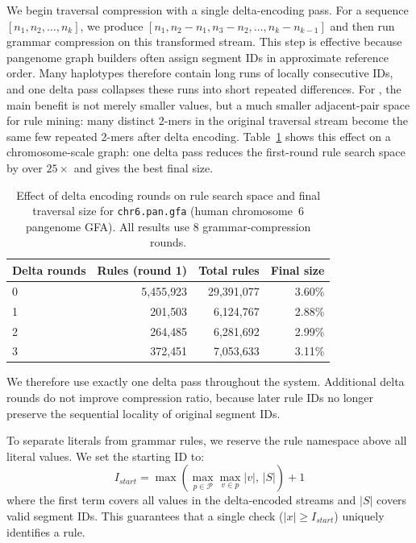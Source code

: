 We begin traversal compression with a single delta-encoding pass. For a sequence $[n_1, n_2, \ldots, n_k]$, we produce $[n_1, n_2 - n_1, n_3 - n_2, \ldots, n_k - n_{k-1}]$ and then run grammar compression on this transformed stream.
This step is effective because pangenome graph builders often assign segment IDs in approximate reference order. Many haplotypes therefore contain long runs of locally consecutive IDs, and one delta pass collapses these runs into short repeated differences. For \gfaz, the main benefit is not merely smaller values, but a much smaller adjacent-pair space for rule mining: many distinct 2-mers in the original traversal stream become the same few repeated 2-mers after delta encoding. Table~\ref{tab:delta-rounds} shows this effect on a chromosome-scale graph: one delta pass reduces the first-round rule search space by over $25\times$ and gives the best final size.

\begin{table}[t]
  \caption{Effect of delta encoding rounds on rule search space and final traversal size for \texttt{chr6.pan.gfa} (human chromosome~6 pangenome GFA). All results use 8 grammar-compression rounds.}
  \label{tab:delta-rounds}
  \small
  \begin{tabular}{lrrr}
    \hline
    \textbf{Delta rounds} & \textbf{Rules (round 1)} & \textbf{Total rules} & \textbf{Final size} \\
    \hline
    0                     & 5{,}455{,}923            & 29{,}391{,}077       & 3.60\%              \\
    1                     & 201{,}503                & 6{,}124{,}767        & 2.88\%              \\
    2                     & 264{,}485                & 6{,}281{,}692        & 2.99\%              \\
    3                     & 372{,}451                & 7{,}053{,}633        & 3.11\%              \\
    \hline
  \end{tabular}
\end{table}

We therefore use exactly one delta pass throughout the system. Additional delta rounds do not improve compression ratio, because later rule IDs no longer preserve the sequential locality of original segment IDs.

To separate literals from grammar rules, we reserve the rule namespace above all literal values. We set the starting ID to:
\begin{equation}
  I_{start} = \max\left(\max_{p \in \mathcal{P}} \max_{v \in p} |v|, \, |S|\right) + 1
\end{equation}
where the first term covers all values in the delta-encoded streams and $|S|$ covers valid segment IDs. This guarantees that a single check ($|x| \ge I_{start}$) uniquely identifies a rule.

